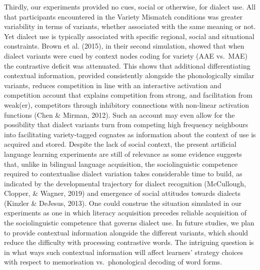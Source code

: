 \documentclass[doc,floatsintext]{apa6}
\begin{document}
Thirdly, our experiments provided no cues, social or otherwise, for
dialect use. All that participants encountered in the Variety Mismatch
conditions was greater variability in terms of variants, whether
associated with the same meaning or not. Yet dialect use is typically
associated with specific regional, social and situational constraints.
Brown et al. (2015), in their second simulation, showed that when
dialect variants were cued by context nodes coding for variety (AAE
vs.~MAE) the contrastive deficit was attenuated. This shows that
additional differentiating contextual information, provided consistently
alongside the phonologically similar variants, reduces competition in
line with an interactive activation and competition account that
explains competition from strong, and facilitation from weak(er),
competitors through inhibitory connections with non-linear activation
functions (Chen \& Mirman, 2012). Such an account may even allow for the
possibility that dialect variants turn from competing high frequency
neighbours into facilitating variety-tagged cognates as information
about the context of use is acquired and stored. Despite the lack of
social context, the present artificial language learning experiments are
still of relevance as some evidence suggests that, unlike in bilingual
language acquisition, the sociolinguistic competence required to
contextualise dialect variation takes considerable time to build, as
indicated by the developmental trajectory for dialect recognition
(McCullough, Clopper, \& Wagner, 2019) and emergence of social attitudes
towards dialects (Kinzler \& DeJesus, 2013). One could construe the
situation simulated in our experiments as one in which literacy
acquisition precedes reliable acquisition of the sociolinguistic
competence that governs dialect use. In future studies, we plan to
provide contextual information alongside the different variants, which
should reduce the difficulty with processing contrastive words. The
intriguing question is in what ways such contextual information will
affect learners' strategy choices with respect to memorisation
vs.~phonological decoding of word forms.
\end{document}
